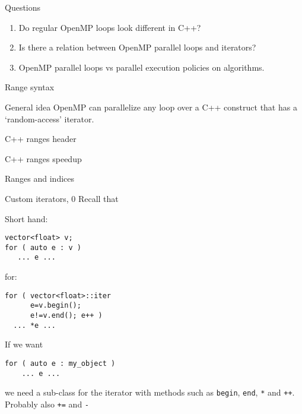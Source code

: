 \documentclass[10pt]{beamer}
\begin{document}

\begin{numberedframe}{Questions}
  \begin{enumerate}
  \item Do regular OpenMP loops look different in C++?
  \item Is there a relation between OpenMP parallel loops and iterators?
  \item OpenMP parallel loops vs parallel execution policies on algorithms.
  \end{enumerate}
\end{numberedframe}

\begin{numberedframe}{Range syntax}
  
\end{numberedframe}

\begin{numberedframe}{General idea}
  OpenMP can parallelize any loop over a C++ construct
  that has a `random-access' iterator.
\end{numberedframe}

\begin{numberedframe}{C++ ranges header}
  
\end{numberedframe}

\begin{numberedframe}{C++ ranges speedup}
  
\end{numberedframe}

\begin{numberedframe}{Ranges and indices}
    
\end{numberedframe}

\begin{numberedframe}{Custom iterators, 0}
  Recall that
\begin{multicols}{2}
Short hand:
\begin{lstlisting}
vector<float> v;
for ( auto e : v )
   ... e ...
\end{lstlisting}
\columnbreak for:
\begin{lstlisting}
for ( vector<float>::iter
      e=v.begin();
      e!=v.end(); e++ )
  ... *e ...
\end{lstlisting}
\end{multicols}
If we want 
\begin{lstlisting}
for ( auto e : my_object )
    ... e ...
\end{lstlisting}
we need a sub-class for the iterator with methods such as
\lstinline{begin}, \lstinline{end},
\lstinline|*| and \lstinline|++|.\\
Probably also \lstinline|+=| and \lstinline|-|
\end{numberedframe}
\end{document}
